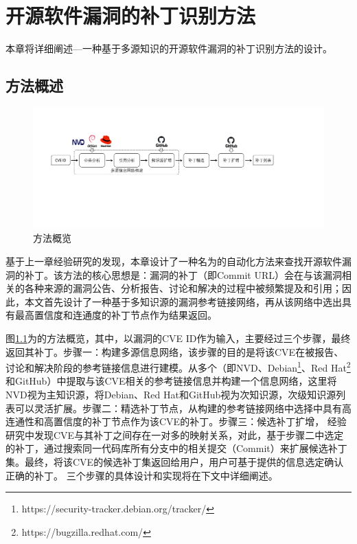 
\chapter{开源软件漏洞的补丁识别方法}

本章将详细阐述\tool ---一种基于多源知识的开源软件漏洞的补丁识别方法的设计。

\section{方法概述}
\begin{figure}[h]
    \centering
    \includegraphics[scale=0.40]{fig/overview.pdf}
    \caption{\tool 方法概览}\label{fig:overview}
\end{figure}

基于上一章经验研究的发现，本章设计了一种名为\tool 的自动化方法来查找开源软件漏洞的补丁。该方法的核心思想是：漏洞的补丁（即Commit URL）会在与该漏洞相关的各种来源的漏洞公告、分析报告、讨论和解决的过程中被频繁提及和引用；因此，本文首先设计了一种基于多知识源的漏洞参考链接网络，再从该网络中选出具有最高置信度和连通度的补丁节点作为结果返回。

图\ref{fig:overview}为\tool 的方法概览，其中，\tool 以漏洞的CVE ID作为输入，主要经过三个步骤，最终返回其补丁。步骤一：构建多源信息网络，该步骤的目的是将该CVE在被报告、讨论和解决阶段的参考链接信息进行建模。\tool 从多个（即NVD、Debian\footnote{https://security-tracker.debian.org/tracker/}、Red Hat\footnote{https://bugzilla.redhat.com/}和GitHub）中提取与该CVE相关的参考链接信息并构建一个信息网络，这里将NVD视为主知识源，将Debian、Red Hat和GitHub视为次知识源，次级知识源列表可以灵活扩展。步骤二：精选补丁节点，\tool 从构建的参考链接网络中选择中具有高连通性和高置信度的补丁节点作为该CVE的补丁。步骤三：候选补丁扩增， 经验研究中发现CVE与其补丁之间存在一对多的映射关系，对此，基于步骤二中选定的补丁，\tool 通过搜索同一代码库所有分支中的相关提交（Commit）来扩展候选补丁集。最终，\tool 将该CVE的候选补丁集返回给用户，用户可基于\tool 提供的信息选定确认正确的补丁。%
三个步骤的具体设计和实现将在下文中详细阐述。

